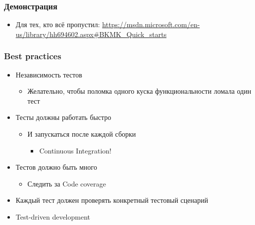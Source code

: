 \documentclass{../../slides-style}
\begin{document}
    \begin{frame}
        \frametitle{Демонстрация}
        \begin{itemize}
            \item Для тех, кто всё пропустил: \url{https://msdn.microsoft.com/en-us/library/hh694602.aspx\#BKMK\_Quick\_starts}
        \end{itemize}
    \end{frame}

    \begin{frame}
        \frametitle{Best practices}
        \begin{itemize}
            \item Независимость тестов
            \begin{itemize}
                \item Желательно, чтобы поломка одного куска функциональности ломала один тест
            \end{itemize}
            \item Тесты должны работать быстро
            \begin{itemize}
                \item И запускаться после каждой сборки
                \begin{itemize}
                    \item Continuous Integration!
                \end{itemize}
            \end{itemize}
            \item Тестов должно быть много
            \begin{itemize}
                \item Следить за Code coverage
            \end{itemize}
            \item Каждый тест должен проверять конкретный тестовый сценарий
            \item Test-driven development
        \end{itemize}
    \end{frame}
\end{document}
